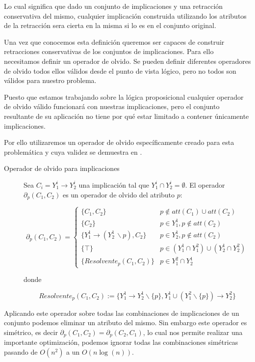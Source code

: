 Lo cual significa que dado un conjunto de implicaciones y una retracción conservativa del mismo, cualquier implicación construida utilizando los atributos de la retracción sera cierta en la misma si lo es en el conjunto original.

Una vez que conocemos esta definición queremos ser capaces de construir retracciones conservativas de los conjuntos de implicaciones. Para ello necesitamos definir un operador de olvido. Se pueden definir diferentes operadores de olvido todos ellos válidos desde el punto de vista lógico, pero no todos son válidos para nuestro problema.

Puesto que estamos trabajando sobre la lógica proposicional cualquier operador de olvido válido funcionará con nuestras implicaciones, pero el conjunto resultante de su aplicación no tiene por qué estar limitado a contener únicamente implicaciones. 

Por ello utilizaremos un operador de olvido específicamente creado para esta problemática y cuya validez se demuestra en \cite{retraccion}.


\begin{description}
	\item[Operador de olvido para implicaciones] 
	Sea $C_i = Y_{1}^i \rightarrow Y_{2}^i$  una implicación tal que $Y_{1}^i \cap Y_{2}^i = \emptyset$. El operador $\partial_p (C_1, C_2)$ es un operador de olvido del atributo $p$:
	
	\begin{equation}
	\label{operadorOlvido}
	\partial_p (C_1, C_2) = 			
	\begin{cases} 
	\{C_1, C_2\} & p \notin att(C_1) \cup att(C_2) \\
	\{C_2\} &  p \in Y_1^1, p \notin att(C_2) \\
	\{Y_1^1 \rightarrow (Y_2^1 \, \backslash p) , C_2\} & p \in Y_2^1, p \notin att(C_2) \\
	\{ \top \} & p \in (Y_1^1 \cap Y_1^2) \cup (Y_2^1 \cap Y_2^2) \\
	\{Resolvente_p(C_1, C_2)\} & p \in Y_1^2 \cap Y_2^1
	\end{cases}
	\end{equation}
	
	donde 
	
	\[
	Resolvente_p(C_1, C_2) := \{Y_1^1 \rightarrow Y_2^1 \backslash \{p\}, Y_1^1 \cup (Y_1^2 \backslash \{p\}) \rightarrow Y_2^2 \}
	\]
	
\end{description}

Aplicando este operador sobre todas las combinaciones de implicaciones de un conjunto podemos eliminar un atributo del mismo. Sin embargo este operador es simétrico, es decir $\partial_p (C_1, C_2) = \partial_p (C_2, C_1)$, lo cual nos permite realizar una importante optimización, podemos ignorar todas las combinaciones simétricas pasando de $O(n^2)$ a un $O(n\log(n))$.




	

